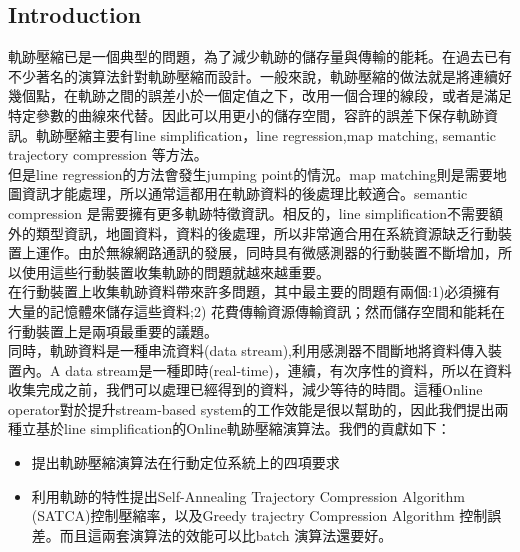 \documentclass[12pt]{article}
\begin{document}
 
\begin{CJK}{UTF8}{bsmi} 

\section{Introduction}

軌跡壓縮已是一個典型的問題，為了減少軌跡的儲存量與傳輸的能耗。在過去已有不少著名的演算法針對軌跡壓縮而設計。一般來說，軌跡壓縮的做法就是將連續好幾個點，在軌跡之間的誤差小於一個定值之下，改用一個合理的線段，或者是滿足特定參數的曲線來代替。因此可以用更小的儲存空間，容許的誤差下保存軌跡資訊。軌跡壓縮主要有line simplification\cite{1961:Bellman}\cite{1973:DP}\cite{2004:TDTROPW}\cite{2006:STTrace}，line regression\cite{2004:ICDE_lineregress},map matching\cite{2005:ICDT_map1}\cite{2004:Map2}, semantic trajectory compression\cite{2009:SSTD_Semantic}\cite{2009:LBSN_semantic} 等方法。\\

但是line regression的方法會發生jumping point的情況。map matching則是需要地圖資訊才能處理，所以通常這都用在軌跡資料的後處理比較適合。semantic compression 是需要擁有更多軌跡特徵資訊。相反的，line simplification不需要額外的類型資訊，地圖資料，資料的後處理，所以非常適合用在系統資源缺乏行動裝置上運作。由於無線網路通訊的發展，同時具有微感測器的行動裝置不斷增加，所以使用這些行動裝置收集軌跡的問題就越來越重要。\\

在行動裝置上收集軌跡資料帶來許多問題，其中最主要的問題有兩個:1)必須擁有大量的記憶體來儲存這些資料;2) 花費傳輸資源傳輸資訊；然而儲存空間和能耗在行動裝置上是兩項最重要的議題。\\


同時，軌跡資料是一種串流資料(data stream),利用感測器不間斷地將資料傳入裝置內。A data stream是一種即時(real-time)，連續，有次序性的資料\cite{2003Issues}，所以在資料收集完成之前，我們可以處理已經得到的資料，減少等待的時間。這種Online operator對於提升stream-based system的工作效能是很以幫助的，因此我們提出兩種立基於line simplification的Online軌跡壓縮演算法。我們的貢獻如下：
	\begin{itemize}
		\item 提出軌跡壓縮演算法在行動定位系統上的四項要求
		\item 利用軌跡的特性提出Self-Annealing Trajectory Compression Algorithm (SATCA)控制壓縮率，以及Greedy trajectry Compression Algorithm 控制誤差。而且這兩套演算法的效能可以比batch 演算法還要好。
	\end{itemize}



\end{CJK}
\end{document}
